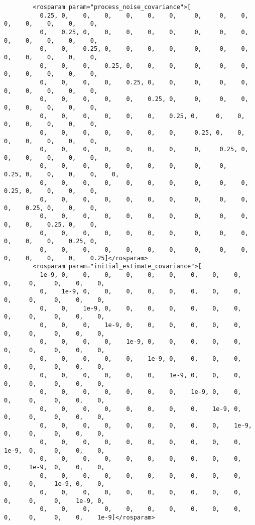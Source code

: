 \begin{center}
\begin{footnotesize}
\begin{verbatim}
        <rosparam param="process_noise_covariance">[
          0.25, 0,    0,    0,    0,    0,    0,     0,     0,    0,    0,    0,    0,    0,    0,
          0,    0.25, 0,    0,    0,    0,    0,     0,     0,    0,    0,    0,    0,    0,    0,
          0,    0,    0.25, 0,    0,    0,    0,     0,     0,    0,    0,    0,    0,    0,    0,
          0,    0,    0,    0.25, 0,    0,    0,     0,     0,    0,    0,    0,    0,    0,    0,
          0,    0,    0,    0,    0.25, 0,    0,     0,     0,    0,    0,    0,    0,    0,    0,
          0,    0,    0,    0,    0,    0.25, 0,     0,     0,    0,    0,    0,    0,    0,    0,
          0,    0,    0,    0,    0,    0,    0.25, 0,     0,    0,    0,    0,    0,    0,    0,
          0,    0,    0,    0,    0,    0,    0,     0.25, 0,    0,    0,    0,    0,    0,    0,
          0,    0,    0,    0,    0,    0,    0,     0,     0.25, 0,    0,    0,    0,    0,    0,
          0,    0,    0,    0,    0,    0,    0,     0,     0,    0.25, 0,    0,    0,    0,    0,
          0,    0,    0,    0,    0,    0,    0,     0,     0,    0,    0.25, 0,    0,    0,    0,
          0,    0,    0,    0,    0,    0,    0,     0,     0,    0,    0,    0.25, 0,    0,    0,
          0,    0,    0,    0,    0,    0,    0,     0,     0,    0,    0,    0,    0.25, 0,    0,
          0,    0,    0,    0,    0,    0,    0,     0,     0,    0,    0,    0,    0,    0.25, 0,
          0,    0,    0,    0,    0,    0,    0,     0,     0,    0,    0,    0,    0,    0,    0.25]</rosparam>
        <rosparam param="initial_estimate_covariance">[
          1e-9, 0,    0,    0,    0,    0,    0,    0,    0,    0,     0,     0,     0,    0,    0,
          0,    1e-9, 0,    0,    0,    0,    0,    0,    0,    0,     0,     0,     0,    0,    0,
          0,    0,    1e-9, 0,    0,    0,    0,    0,    0,    0,     0,     0,     0,    0,    0,
          0,    0,    0,    1e-9, 0,    0,    0,    0,    0,    0,     0,     0,     0,    0,    0,
          0,    0,    0,    0,    1e-9, 0,    0,    0,    0,    0,     0,     0,     0,    0,    0,
          0,    0,    0,    0,    0,    1e-9, 0,    0,    0,    0,     0,     0,     0,    0,    0,
          0,    0,    0,    0,    0,    0,    1e-9, 0,    0,    0,     0,     0,     0,    0,    0,
          0,    0,    0,    0,    0,    0,    0,    1e-9, 0,    0,     0,     0,     0,    0,    0,
          0,    0,    0,    0,    0,    0,    0,    0,    1e-9, 0,     0,     0,     0,    0,    0,
          0,    0,    0,    0,    0,    0,    0,    0,    0,    1e-9,  0,     0,     0,    0,    0,
          0,    0,    0,    0,    0,    0,    0,    0,    0,    0,     1e-9,  0,     0,    0,    0,
          0,    0,    0,    0,    0,    0,    0,    0,    0,    0,     0,     1e-9,  0,    0,    0,
          0,    0,    0,    0,    0,    0,    0,    0,    0,    0,     0,     0,     1e-9, 0,    0,
          0,    0,    0,    0,    0,    0,    0,    0,    0,    0,     0,     0,     0,    1e-9, 0,
          0,    0,    0,    0,    0,    0,    0,    0,    0,    0,     0,     0,     0,    0,    1e-9]</rosparam>



\end{verbatim}
\end{footnotesize}
\end{center}
